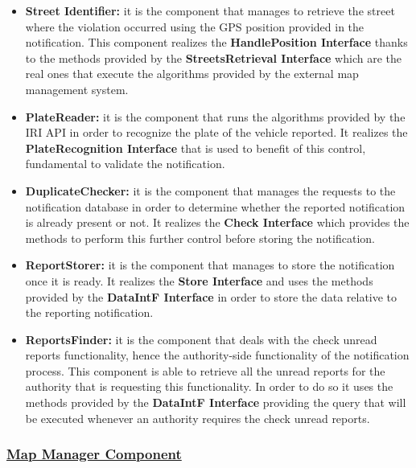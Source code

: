 			\begin{itemize}
				\item \textbf{Street Identifier:} it is the component that manages to retrieve the street where the violation occurred using the GPS position provided in the notification. This component realizes the \textbf{HandlePosition Interface} thanks to the methods provided by the \textbf{StreetsRetrieval Interface} which are the real ones that execute the algorithms provided by the external map management system.
				
				\item \textbf{PlateReader:} it is the component that runs the algorithms provided by the IRI API in order to recognize the plate of the vehicle reported. It realizes the \textbf{PlateRecognition Interface} that is used to benefit of this control, fundamental to validate the notification.
				
				\item \textbf{DuplicateChecker:} it is the component that manages the requests to the notification database in order to determine whether the reported notification is already present or not. It realizes the \textbf{Check Interface} which provides the methods to perform this further control before storing the notification.
				
				\item \textbf{ReportStorer:} it is the component that manages to store the notification once it is ready. It realizes the \textbf{Store Interface} and uses the methods provided by the \textbf{DataIntF Interface} in order to store the data relative to the reporting notification.
				
				\item \textbf{ReportsFinder:} it is the component that deals with the check unread reports functionality, hence the authority-side functionality of the notification process. This component is able to retrieve all the unread reports for the authority that is requesting this functionality. In order to do so it uses the methods provided by the \textbf{DataIntF Interface} providing the query that will be executed whenever an authority requires the check unread reports.
			\end{itemize}
		
		\subsubsection[Map Manager Component]{\hyperlink{toc}{Map Manager Component}}
			\label{sec:mapManagerComponent}
			
